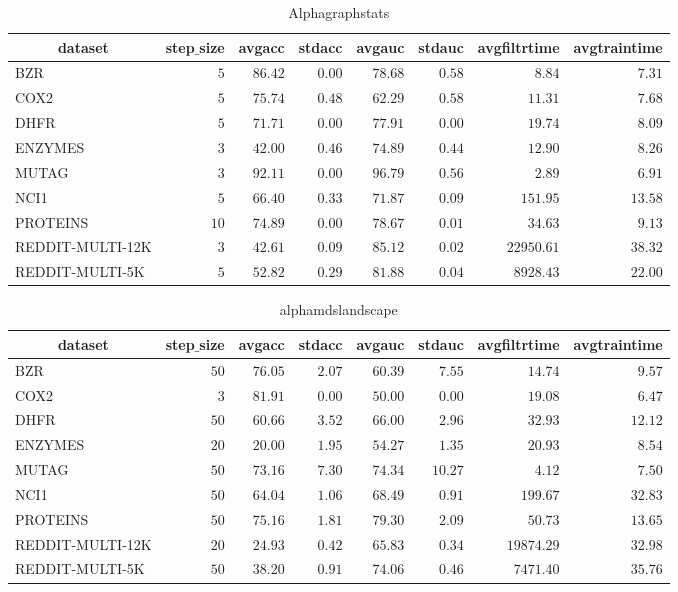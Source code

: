 \documentclass[]{article}
\begin{document}
\begin{table}[!tbp]
\caption{Alphagraphstats\label{Alphagraphstats}} 
{\centering
\begin{tabular}{lrrrrrrr}
\hline\hline
\multicolumn{1}{c}{dataset}&\multicolumn{1}{c}{step$\_$size}&\multicolumn{1}{c}{avgacc}&\multicolumn{1}{c}{stdacc}&\multicolumn{1}{c}{avgauc}&\multicolumn{1}{c}{stdauc}&\multicolumn{1}{c}{avgfiltrtime}&\multicolumn{1}{c}{avgtraintime}\tabularnewline
\hline
BZR&$ 5$&$86.42$&$0.00$&$78.68$&$0.58$&$    8.84$&$ 7.31$\tabularnewline
COX2&$ 5$&$75.74$&$0.48$&$62.29$&$0.58$&$   11.31$&$ 7.68$\tabularnewline
DHFR&$ 5$&$71.71$&$0.00$&$77.91$&$0.00$&$   19.74$&$ 8.09$\tabularnewline
ENZYMES&$ 3$&$42.00$&$0.46$&$74.89$&$0.44$&$   12.90$&$ 8.26$\tabularnewline
MUTAG&$ 3$&$92.11$&$0.00$&$96.79$&$0.56$&$    2.89$&$ 6.91$\tabularnewline
NCI1&$ 5$&$66.40$&$0.33$&$71.87$&$0.09$&$  151.95$&$13.58$\tabularnewline
PROTEINS&$10$&$74.89$&$0.00$&$78.67$&$0.01$&$   34.63$&$ 9.13$\tabularnewline
REDDIT-MULTI-12K&$ 3$&$42.61$&$0.09$&$85.12$&$0.02$&$22950.61$&$38.32$\tabularnewline
REDDIT-MULTI-5K&$ 5$&$52.82$&$0.29$&$81.88$&$0.04$&$ 8928.43$&$22.00$\tabularnewline
\hline
\end{tabular}}
\end{table}
\begin{table}[!tbp]
\caption{alphamdslandscape\label{alphamdslandscape}} 
{\centering
\begin{tabular}{lrrrrrrr}
\hline\hline
\multicolumn{1}{c}{dataset}&\multicolumn{1}{c}{step$\_$size}&\multicolumn{1}{c}{avgacc}&\multicolumn{1}{c}{stdacc}&\multicolumn{1}{c}{avgauc}&\multicolumn{1}{c}{stdauc}&\multicolumn{1}{c}{avgfiltrtime}&\multicolumn{1}{c}{avgtraintime}\tabularnewline
\hline
BZR&$50$&$76.05$&$2.07$&$60.39$&$ 7.55$&$   14.74$&$ 9.57$\tabularnewline
COX2&$ 3$&$81.91$&$0.00$&$50.00$&$ 0.00$&$   19.08$&$ 6.47$\tabularnewline
DHFR&$50$&$60.66$&$3.52$&$66.00$&$ 2.96$&$   32.93$&$12.12$\tabularnewline
ENZYMES&$20$&$20.00$&$1.95$&$54.27$&$ 1.35$&$   20.93$&$ 8.54$\tabularnewline
MUTAG&$50$&$73.16$&$7.30$&$74.34$&$10.27$&$    4.12$&$ 7.50$\tabularnewline
NCI1&$50$&$64.04$&$1.06$&$68.49$&$ 0.91$&$  199.67$&$32.83$\tabularnewline
PROTEINS&$50$&$75.16$&$1.81$&$79.30$&$ 2.09$&$   50.73$&$13.65$\tabularnewline
REDDIT-MULTI-12K&$20$&$24.93$&$0.42$&$65.83$&$ 0.34$&$19874.29$&$32.98$\tabularnewline
REDDIT-MULTI-5K&$50$&$38.20$&$0.91$&$74.06$&$ 0.46$&$ 7471.40$&$35.76$\tabularnewline
\hline
\end{tabular}}
\end{table}
\end{document}
